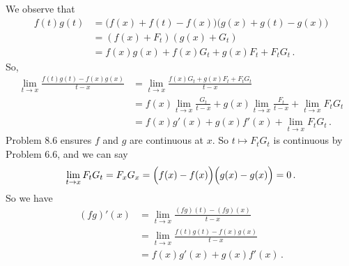 \documentclass{article}
\begin{document}
We observe that
\begin{align*}
    f(t)g(t) &= \bigl(f(x) + f(t) - f(x)\bigr) \bigl(g(x) + g(t) - g(x)\bigr) \\
    &= (f(x) + F_t)(g(x) + G_t) \\
    &= f(x)g(x) + f(x) G_t + g(x) F_t + F_t G_t \,.
\end{align*}
So,
\begin{align*}
    \lim_{t \to x} \frac{f(t)g(t) - f(x)g(x)}{t-x} &= \lim_{t \to x} \frac{f(x)G_t + g(x) F_t + F_t G_t}{t-x} \\
    &= f(x) \lim_{t \to x} \frac{G_t}{t-x} + g(x) \lim_{t \to x} \frac{F_t}{t-x} + \lim_{t \to x} F_t G_t \\
    &= f(x) g'(x) + g(x) f'(x) + \lim_{t \to x} F_t G_t \,.
\end{align*}
Problem 8.6 ensures $f$ and $g$ are continuous at $x$. So $t \mapsto F_t G_t$ is continuous
by Problem 6.6, and we can say
\begin{align*}
    \lim_{t \to x} F_t G_t
    = F_x G_x = \Bigl( f(x) - f(x) \Bigr) \Bigl( g(x) - g(x) \Bigr) = 0 \,.
\end{align*}
So we have
\begin{align*}
    (fg)'(x)
    &= \lim_{t \to x} \frac{(fg)(t) - (fg)(x)}{t-x} \\
    &= \lim_{t \to x} \frac{f(t)g(t) - f(x)g(x)}{t-x} \\
    &= f(x) g'(x) + g(x) f'(x) \,.
\end{align*}

\qedsymbol
\end{document}
